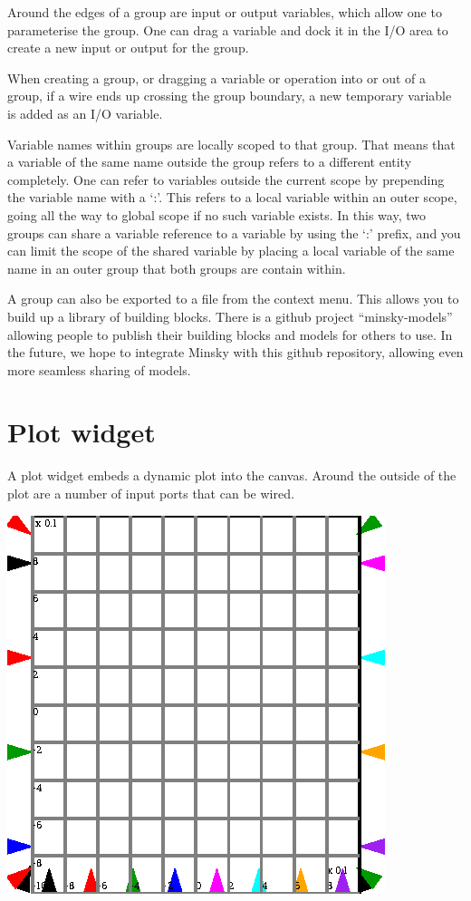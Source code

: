 Around the edges of a group are input or output variables, which allow
one to parameterise the group. One can drag a variable and dock it in
the I/O area to create a new input or output for the group.

When creating a group, or dragging a variable or operation into or out
of a group, if a wire ends up crossing the group boundary, a new
temporary variable is added as an I/O variable.

Variable names within groups are locally scoped to that group. That
means that a variable of the same name outside the group refers to a
different entity completely. One can refer to variables outside the
current scope by prepending the variable name with a `:'. This refers
to a local variable within an outer scope, going all the way to global
scope if no such variable exists. In this way, two groups can share
a variable reference to a variable by using the `:' prefix, and you
can limit the scope of the shared variable by placing a local variable
of the same name in an outer group that both groups are contain within.

A group can also be exported to a file from the context menu.
This allows you to build up a library of building blocks. There is a
github project ``minsky-models'' allowing people to publish their
building blocks and models for others to use. In the future, we hope
to integrate Minsky with this github repository, allowing even more
seamless sharing of models.

\section{Plot widget}
\label{PlotWidget}

A plot widget embeds a dynamic plot into the canvas. Around the
outside of the plot are a number of input ports that can be wired.

\begin{center}
\includegraphics{images/plotWidget.eps}
\end{center}

